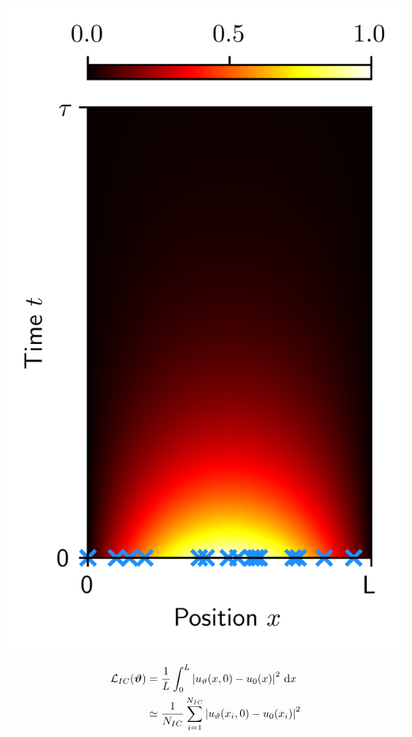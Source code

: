 \documentclass[aspectratio=169,compress,12pt,dvipsnames]{beamer}
\begin{document}
\begin{frame}
  \vfill
  \begin{minipage}{.28\textwidth}
    \centering
    \includegraphics[width=\textwidth]{initial_condition_sampling.png}
  \end{minipage}%
  \hfill
  \begin{minipage}{.68\textwidth}
    \[
      \begin{aligned}
        \mathcal{L}_{IC}(\boldsymbol{\vartheta}) &  = \dfrac{1}{L} \int_{0}^{L} \abs{ u_{\vartheta}(x, 0) - u_0(x) }^2 \ \dd x  \\
          & \simeq \dfrac{1}{N_{IC}} \sum_{i=1}^{N_{IC}} \abs{ u_{\vartheta}(x_i, 0) - u_0(x_i) }^2
      \end{aligned}
    \]
  \end{minipage}
  \vfill
\end{frame}
\end{document}
